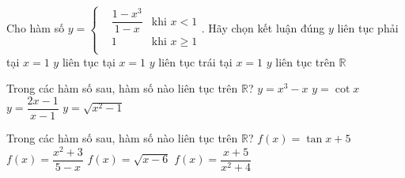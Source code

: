 \begin{ex}%
	Cho hàm số $y=\left\{ \begin{aligned}
		& \dfrac{1-x^3}{1-x}&\text{khi  }x<1 \\
		& 1\text{  }&\text{khi  }x\ge 1 \\
	\end{aligned} \right.$. Hãy chọn kết luận đúng
	\choice
	{\True $y$ liên tục phải tại $x=1$}
	{$y$ liên tục tại $x=1$}
	{$y$ liên tục trái tại $x=1$}
	{$y$ liên tục trên $\mathbb{R}$}
\end{ex}
\begin{ex}%
	
	Trong các hàm số sau, hàm số nào liên tục trên $\mathbb{R}$?
	\choice
	{\True $y=x^3-x$}
	{$y=\cot x$}
	{$y=\dfrac{2x-1}{x-1}$}
	{$y=\sqrt{x^2-1}$}
\end{ex}
\begin{ex}%
	Trong các hàm số sau, hàm số nào liên tục trên $\mathbb{R}$?
	\choice
	{$f\left( x \right)=\tan x+5$}
	{$f\left( x \right)=\dfrac{x^2+3}{5-x}$}
	{$f\left( x \right)=\sqrt{x-6}$}
	{\True $f\left( x \right)=\dfrac{x+5}{x^2+4}$}
\end{ex}
